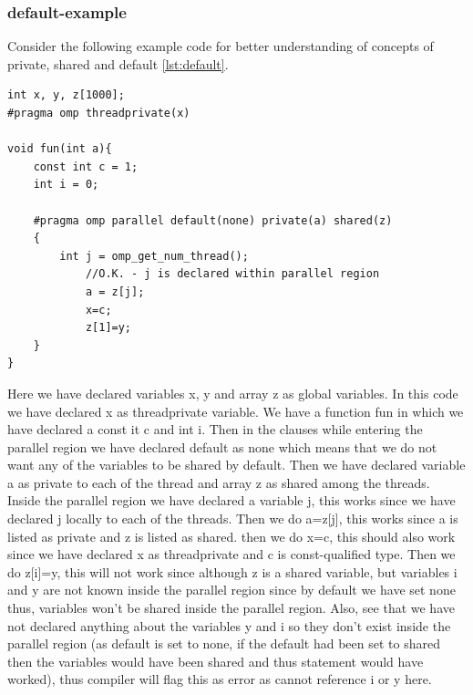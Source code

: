 \documentclass[12pt]{book}
\begin{document}
\subsubsection{default-example}
Consider the following example code for better understanding of concepts of private, shared and default \ref{lst:default}.
\begin{lstlisting}[caption={default-Example},captionpos=b,label={lst:default}]
int x, y, z[1000];
#pragma omp threadprivate(x)

void fun(int a){
    const int c = 1;
    int i = 0;

    #pragma omp parallel default(none) private(a) shared(z)
    {
        int j = omp_get_num_thread();
            //O.K. - j is declared within parallel region
            a = z[j];
            x=c;
            z[1]=y;
    }
}
\end{lstlisting}
Here we have declared variables x, y and array z as global variables. In this code we have declared x as threadprivate variable.  We have a function fun in which we have declared a const it c and int i. Then in the clauses while entering the parallel region we have declared default as none which means that we do not want any of the variables to be shared by default. Then we have declared variable a as private to each of the thread and array z as shared among the threads. Inside the parallel region we have declared a variable j, this works since we have declared j locally to each of the threads. Then we do a=z[j], this works since a is listed as private and z is listed as shared. then we do x=c, this should also work since we have declared x as threadprivate and c is const-qualified type. Then we do z[i]=y, this will not work since although z is a shared variable, but variables i and y are not known inside the parallel region since by default we have set none thus, variables won't be shared inside the parallel region. Also, see that we have not declared anything about the variables y and i so they don't exist inside the parallel region (as default is set to none, if the default had been set to shared then the variables would have been shared and thus statement would have worked), thus compiler will flag this as error as cannot reference i or y here.
\end{document}
